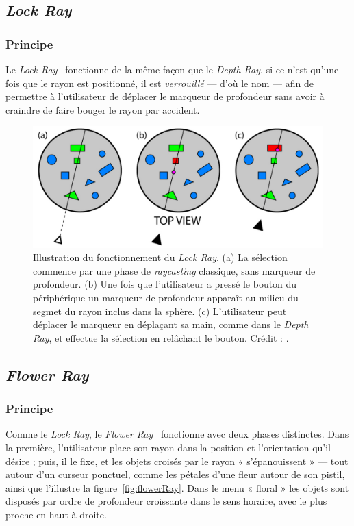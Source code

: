 	\subsection{\emph{Lock Ray}}
	\subsubsection{Principe}
	Le \emph{Lock Ray}~\cite{grossman2006design} fonctionne de la même façon que le \emph{Depth Ray}, si ce n'est qu'une fois que le rayon est positionné, il est \emph{verrouillé} --- d'où le nom --- afin de permettre à l'utilisateur de déplacer le marqueur de profondeur sans avoir à craindre de faire bouger le rayon par accident.
	
	\begin{figure}[H]
		\centering
		\includegraphics[width=\textwidth]{figures/ch2/lockRay}
		\caption[Principe du \emph{Lock Ray}]{Illustration du fonctionnement du \emph{Lock Ray}. (a) La sélection commence par une phase de \emph{raycasting} classique, sans marqueur de profondeur. (b) Une fois que l'utilisateur a pressé le bouton du périphérique un marqueur de profondeur apparaît au milieu du segmet du rayon inclus dans la sphère. (c) L'utilisateur peut déplacer le marqueur en déplaçant sa main, comme dans le \emph{Depth Ray}, et effectue la sélection en relâchant le bouton. Crédit : \cite{grossman2006design}.}
		\label{fig:lockRay}
	\end{figure}
	
	\subsection{\emph{Flower Ray}}
	\subsubsection{Principe}
	Comme le \emph{Lock Ray}, le \emph{Flower Ray}~\cite{grossman2006design} fonctionne avec deux phases distinctes. Dans la première, l'utilisateur place son rayon dans la position et l'orientation qu'il désire ; puis, il le fixe, et les objets croisés par le rayon « s'épanouissent » --- tout autour d'un curseur ponctuel, comme les pétales d'une fleur autour de son pistil, ainsi que l'illustre la figure~\ref{fig:flowerRay}. Dans le menu « floral » les objets sont disposés par ordre de profondeur croissante dans le sens horaire, avec le plus proche en haut à droite.
	
